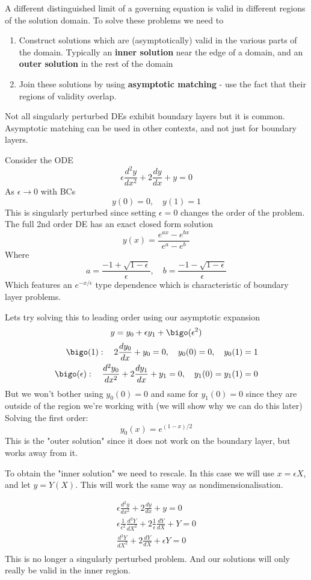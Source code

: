 \documentclass{X:/Documents/Coding/Latex/myassignment}
\begin{document}
A different distinguished limit of a governing equation is valid in different regions of the solution domain. To solve these problems we need to
\begin{enumerate}
    \item Construct solutions which are (asymptotically) valid in the various parts of the domain. Typically an \textbf{inner solution} near the edge of a domain, and an \textbf{outer solution} in the rest of the domain
    \item Join these solutions by using \textbf{asymptotic matching} - use the fact that their regions of validity overlap.
    
\end{enumerate}
Not all singularly perturbed DEs exhibit boundary layers but it is common. Asymptotic matching can be used in other contexts, and not just for boundary layers.

Consider the ODE
\[\epsilon \frac{d^2y}{dx^2} + 2\frac{dy}{dx} +y =0\]
As $\epsilon \to 0$ with BCs
\[y(0) = 0,\quad y(1)=1\]
This is singularly perturbed since setting $\epsilon = 0$ changes the order of the problem.
The full 2nd order DE has an exact closed form solution
\[y(x) = \frac{e^{ax} - e^{bx}}{e^a - e^b}\]
Where
\[a = \frac{-1+\sqrt{1-\epsilon}}\epsilon , \quad b = \frac{-1-\sqrt{1-\epsilon}}\epsilon \]
Which features an $e^{-x/\epsilon}$ type dependence which is characteristic of boundary layer problems.

Lets try solving this to leading order using our asymptotic expansion
\[y = y_0 + \epsilon y_1 + \bigo(\epsilon^2)\]
\begin{align*}
    \bigo(1):\quad 2 \frac{dy_0}{dx} + y_0 = 0,\quad y_0(0) = 0,\quad y_0(1)=1\\
    \bigo(\epsilon):\quad \frac{d^2y_0}{dx^2} + 2 \frac{dy_1}{dx} + y_1 = 0,\quad y_1(0)=y_1(1)=0
\end{align*}
But we won't bother using $y_0(0)=0$ and same for $y_1(0)=0$ since they are outside of the region we're working with (we will show why we can do this later)
Solving the first order:
\[y_0(x) = e^{(1-x)/2}\]
This is the "outer solution" since it does not work on the boundary layer, but works away from it.

To obtain the "inner solution" we need to rescale. In this case we will use $x = \epsilon X$, and let $y = Y(X)$. This will work the same way as nondimensionalisation.

\begin{align*}
    \epsilon \frac{d^2y}{dx^2} + 2\frac{dy}{dx} + y= 0\\
    \epsilon \frac1{\epsilon^2}\frac{d^2Y}{dX^2} + 2 \frac{1}{\epsilon} \frac{dY}{dX} + Y = 0\\
    \frac{d^2Y}{dX^2} + 2 \frac{dY}{dX} + \epsilon Y = 0\\
\end{align*}
This is no longer a singularly perturbed problem. And our solutions will only really be valid in the inner region.
\end{document}
